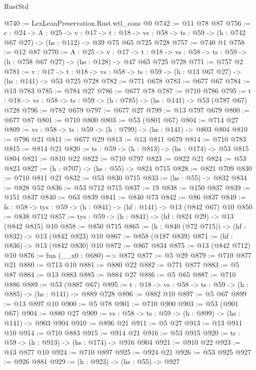\begin{lexlean}{RustStd}
\begin{coremodule}
@740 := LexLeanPreservation.Rust.wtl_cons @0
@742 := @11 @78 @87
@756 := {c : @24} ->
  {A : @25} ->
  {v : @17} ->
  {t : @18} ->
  {vs : @58} -> {ts : @59} -> (h : @742 @67 @27) -> (hs : @112) -> @39 @75 @65 @725 @728
@757 := @740 @1
@758 := @12 @87
@770 := {A : @25} ->
  {v : @17} ->
  {t : @18} -> {vs : @58} -> {ts : @59} -> (h : @758 @67 @27) -> (hs : @128) -> @47 @65 @725 @728
@771 := @757 @2
@781 := {v : @17} ->
  {t : @18} -> {vs : @58} -> {ts : @59} -> (h : @13 @67 @27) -> (hs : @141) -> @53 @725 @728
@782 := @771 @678
@783 := @677 @67
@784 := @13 @783
@785 := @784 @27
@786 := @677 @78
@787 := @710 @786
@795 := {t : @18} -> {vs : @58} -> {ts : @59} -> (h : @785) -> (hs : @141) -> @53 (@787 @67) @728
@796 := @782 @679
@797 := @677 @27
@799 := @13 @797 @679
@800 := @677 @87
@801 := @710 @800
@803 := @53 (@801 @67)
@804 := @714 @27
@809 := {vs : @58} -> {ts : @59} -> (h : @799) -> (hs : @141) -> @803 @804
@810 := @796 @21
@811 := @677 @29
@813 := @13 @811 @679
@814 := @710 @783
@815 := @814 @21
@820 := {ts : @59} -> (h : @813) -> (hs : @174) -> @53 @815 @804
@821 := @810 @22
@822 := @710 @797
@823 := @822 @21
@824 := @53 @823
@827 := (h : @707) -> (hs : @55) -> @824 @715
@828 := @821 @709
@830 := @710 @811 @21
@832 := @53 @830 @715
@833 := (hs : @55) -> @832
@834 := @828 @52
@836 := @53 @712 @715
@837 := 19
@838 := @150 @837
@839 := @151 @837
@840 := @63 @839
@841 := @840 @73
@842 := @86 @837
@849 := {fs : @58} -> {tys : @59} -> (h : @841) -> (hf : @141) -> @13 (@842 @67) @10
@850 := @838 @712
@857 := {tys : @59} -> (h : @841) -> (hf : @824 @29) -> @13 (@842 @815) @10
@858 := @850 @715
@865 := (h : @840 (@72 @715)) -> (hf : @832) -> @13 (@842 @823) @10
@867 := @858 (@187 @839)
@871 := (hf : @836) -> @13 (@842 @830) @10
@872 := @867 @834
@875 := @13 (@842 @712) @10
@876 := fun (__x0 : @680) => @872
@877 := @5 @29
@879 := @710 @877 @21
@880 := @713 @10
@881 := @880 @22
@882 := @771 @877
@883 := @5 @87
@884 := @13 @883
@885 := @884 @27
@886 := @5 @65
@887 := @710 @886
@889 := @53 (@887 @67)
@895 := {t : @18} -> {vs : @58} -> {ts : @59} -> (h : @885) -> (hs : @141) -> @889 @728
@896 := @882 @10
@897 := @5 @67
@899 := @13 @897 @10
@900 := @5 @78
@901 := @710 @900
@903 := @53 (@901 @67)
@904 := @880 @27
@909 := {vs : @58} -> {ts : @59} -> (h : @899) -> (hs : @141) -> @903 @904
@910 := @896 @21
@911 := @5 @27
@913 := @13 @911 @10
@914 := @710 @883
@915 := @914 @21
@916 := @53 @915
@920 := {ts : @59} -> (h : @913) -> (hs : @174) -> @916 @904
@921 := @910 @22
@923 := @13 @877 @10
@924 := @710 @897
@925 := @924 @21
@926 := @53 @925
@927 := @926 @881
@929 := (h : @923) -> (hs : @55) -> @927

\end{coremodule}
\end{lexlean}
